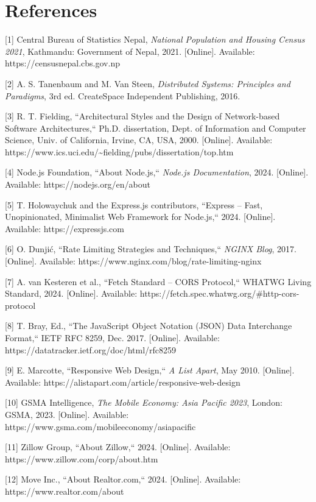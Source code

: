 \documentclass[12pt,a4paper]{report}
\begin{document}
\chapter*{References}
[1] Central Bureau of Statistics Nepal, \textit{National Population and Housing Census 2021}, Kathmandu: Government of Nepal, 2021. [Online]. Available: https://censusnepal.cbs.gov.np

[2] A. S. Tanenbaum and M. Van Steen, \textit{Distributed Systems: Principles and Paradigms}, 3rd ed. CreateSpace Independent Publishing, 2016.

[3] R. T. Fielding, ``Architectural Styles and the Design of Network-based Software Architectures,`` Ph.D. dissertation, Dept. of Information and Computer Science, Univ. of California, Irvine, CA, USA, 2000. [Online]. Available: https://www.ics.uci.edu/\textasciitilde{}fielding/pubs/dissertation/top.htm

[4] Node.js Foundation, ``About Node.js,`` \textit{Node.js Documentation}, 2024. [Online]. Available: https://nodejs.org/en/about

[5] T. Holowaychuk and the Express.js contributors, ``Express -- Fast, Unopinionated, Minimalist Web Framework for Node.js,`` 2024. [Online]. Available: https://expressjs.com

[6] O. Dunjić, ``Rate Limiting Strategies and Techniques,`` \textit{NGINX Blog}, 2017. [Online]. Available: https://www.nginx.com/blog/rate-limiting-nginx

[7] A. van Kesteren et al., ``Fetch Standard -- CORS Protocol,`` WHATWG Living Standard, 2024. [Online]. Available: https://fetch.spec.whatwg.org/\#http-cors-protocol

[8] T. Bray, Ed., ``The JavaScript Object Notation (JSON) Data Interchange Format,`` IETF RFC 8259, Dec. 2017. [Online]. Available: https://datatracker.ietf.org/doc/html/rfc8259

[9] E. Marcotte, ``Responsive Web Design,`` \textit{A List Apart}, May 2010. [Online]. Available: https://alistapart.com/article/responsive-web-design

[10] GSMA Intelligence, \textit{The Mobile Economy: Asia Pacific 2023}, London: GSMA, 2023. [Online]. Available: https://www.gsma.com/mobileeconomy/asiapacific

[11] Zillow Group, ``About Zillow,`` 2024. [Online]. Available: https://www.zillow.com/corp/about.htm

[12] Move Inc., ``About Realtor.com,`` 2024. [Online]. Available: https://www.realtor.com/about
\end{document}
